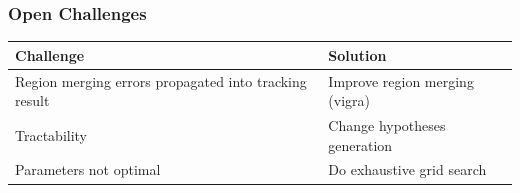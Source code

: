 \begin{frame}[shrink=25]
\begin{figure}
    \end{figure}
\end{frame}

\begin{frame}
    \frametitle{Open Challenges}
    \renewcommand{\arraystretch}{1.5}
    \begin{tabularx}{\textwidth}{X|X}
        Challenge & Solution \\ \hline
        Region merging errors propagated into tracking result  & Improve region merging (vigra) \\
        Tractability & Change hypotheses generation \\
        Parameters not optimal & Do exhaustive grid search \\
    \end{tabularx}
\end{frame}


